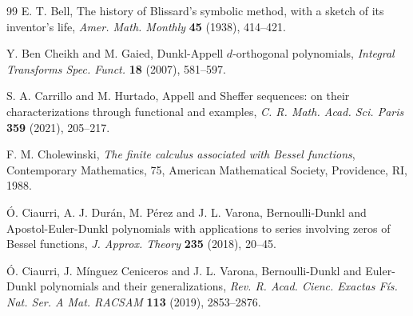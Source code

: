 \documentclass[11pt]{article}
\theoremstyle{plain}
\theoremstyle{remark}
\numberwithin{equation}{section} %
\begin{document}
\begin{thebibliography}{99}
E. T. Bell, 
The history of Blissard's symbolic method, with a sketch of its inventor's life,
\textit{Amer. Math. Monthly}
\textbf{45} (1938), 414--421.

Y. Ben Cheikh and M. Gaied,
Dunkl-Appell $d$-orthogonal polynomials,
\textit{Integral Transforms Spec. Funct.}
\textbf{18} (2007), 581--597.



S. A. Carrillo and M. Hurtado,
Appell and Sheffer sequences: on their characterizations through functional and examples,
\textit{C. R. Math. Acad. Sci. Paris}  
\textbf{359} (2021), 205--217.

F. M. Cholewinski, 
\textit{The finite calculus associated with Bessel functions}, 
Contemporary Mathematics, 75, American Mathematical Society, 
Providence, RI, 1988.

\'O. Ciaurri, A. J. Dur\'an, M. P\'erez and J. L. Varona,
Bernoulli-Dunkl and Apostol-Euler-Dunkl polynomials with applications to series involving
zeros of Bessel functions,
\textit{J. Approx. Theory}
\textbf{235} (2018), 20--45.

\'O. Ciaurri, J. M\'inguez Ceniceros and J. L. Varona,
{Bernoulli-Dunkl and Euler-Dunkl polynomials and their generalizations},
\textit{Rev. R. Acad. Cienc. Exactas F\'is. Nat. Ser. A Mat. RACSAM} 
\textbf{113} (2019), 2853--2876.






\end{thebibliography}
\end{document}
